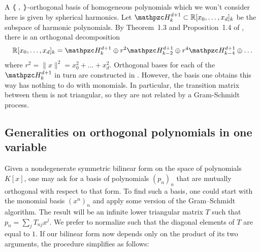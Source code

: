 \begin{remark}\label{sphericalharmonics}
A $\left<\!\!\!\:\left<\ ,\;\right>\!\!\!\:\right>$-orthogonal basis of homogeneous polynomials which we won't consider here is given by spherical harmonics. Let $\Har^{d+1}_k \subset \R[x_0,\ldots,x_d]_k$ be the subspace of harmonic polynomials. By Theorem~1.3 and Proposition~1.4 of \cite{Dai}, there is an orthogonal decomposition
$$
\R[x_0,\ldots,x_d]_k = \Har^{d+1}_k \oplus r^2 \Har^{d+1}_{k-2}\oplus r^4 \Har^{d+1}_{k-4}\oplus \ldots
$$
where $r^2 = \|x\|^2= x_0^2+\ldots +x_d^2$. Orthogonal bases for each of the $\Har^{d+1}_k$ in turn are constructed in \cite[Sect.~2.2]{Dunkl}. However, the basis one obtains this way has nothing to do with monomials. In particular, the transition matrix between them is not triangular, so they are not related by a Gram-Schmidt process.
\end{remark}




\subsection{Generalities on orthogonal polynomials in one variable}
Given a nondegenerate symmetric bilinear form on the space of polynomials $K[x]$, one may ask for a basis of polynomials $(p_n)_n$ that are mutually orthogonal with respect to that form. To find such a basis, one could start with the monomial basis $(x^n)_n$ and apply some version of the Gram--Schmidt algorithm. The result will be an infinite lower triangular matrix $T$ such that $p_n =\sum_j T_{nj} x^j$. We prefer to normalize such that the diagonal elements of $T$ are equal to $1$. If our bilinear form now depends only on the product of its two arguments, the procedure simplifies as follows:

